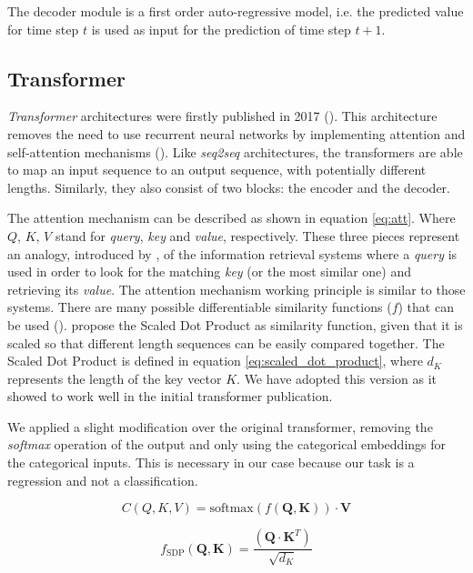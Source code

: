 \documentclass{elsarticle}
\begin{document}
   The decoder module is a first order auto-regressive model, i.e. the predicted value for time step $t$ is used as input for the prediction of time step $t+1$.
   
   
	
	\subsection{Transformer}
	\textit{Transformer} architectures were firstly published  in 2017 (\cite{vaswani2017}). This architecture removes the need to use recurrent neural networks by implementing attention and self-attention mechanisms (\cite{bahdanau2015}).  Like \textit{seq2seq} architectures, the transformers are able to map an input sequence to an output sequence, with potentially different lengths. Similarly, they also consist of two blocks: the encoder and the decoder.
	
	The attention mechanism can be described as shown in equation \ref{eq:att}. Where $Q$, $K$, $V$ stand for \textit{query}, \textit{key} and \textit{value}, respectively. These three pieces represent an analogy, introduced by \cite{vaswani2017}, of the information retrieval systems where a \textit{query} is used in order to look for the matching \textit{key} (or the most similar one) and retrieving its \textit{value}. The attention mechanism working principle is similar to those systems. There are many possible differentiable similarity functions ($f$) that can be used (\cite{kamath2019}). \cite{vaswani2017} propose the Scaled Dot Product as similarity function, given that it is scaled so that different length sequences can be easily compared together. The Scaled Dot Product is defined in equation \ref{eq:scaled_dot_product},  where $d_K$ represents the length of the key vector $K$. We have adopted this version as it showed to work well in the initial transformer publication.
	
	We applied a slight modification over the original transformer, removing the \textit{softmax} operation of the output and only using the categorical embeddings for the categorical inputs. This is necessary in our case because our task is a regression and not a classification.
	
	\begin{equation}
	C(Q,K,V) = \text{softmax}(f(\mathbf{Q}, \mathbf{K})) \cdot \mathbf{V}
	\label{eq:att}
	\end{equation}
	
	\begin{equation}
	f_{\text{SDP}}(\mathbf{Q}, \mathbf{K}) = \frac{(\mathbf{Q} \cdot \mathbf{K}^T)} {\sqrt {d_K}}
	\label{eq:scaled_dot_product}
	\end{equation}
	
\end{document}
